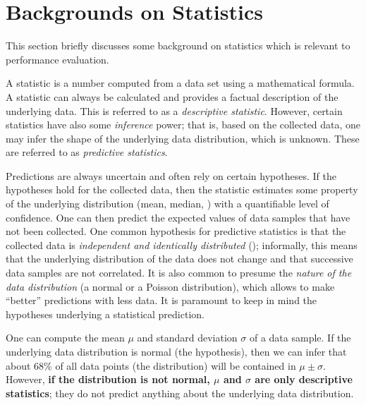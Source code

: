 
\section{Backgrounds on Statistics}
\label{sec:stats}

This section briefly discusses some background on statistics which is relevant to performance evaluation.

A statistic is a number computed from a data set using a mathematical formula.
A statistic can always be calculated and provides a factual description of the underlying data.
This is referred to as a \emph{descriptive statistic}.
However, certain statistics have also some \emph{inference} power; that is, based on the collected data, one may infer the shape of the underlying data distribution, which is unknown. These are referred to as \emph{predictive statistics}.

Predictions are always uncertain and often rely on certain hypotheses. If the hypotheses hold for the collected data, then the statistic estimates some property of the underlying distribution (\eg mean, median, \etc) with a quantifiable level of confidence. One can then predict the expected values of data samples that have not been collected.
One common hypothesis for predictive statistics is that the collected data is \emph{independent and identically distributed} (\iid); informally, this means that the underlying distribution of the data does not change and that successive data samples are not correlated.
It is also common to presume the \emph{nature of the data distribution} (\eg a normal or a Poisson distribution), which allows to make ``better'' predictions with less data.
It is paramount to keep in mind the hypotheses underlying a statistical prediction.

\begin{example}
  One can compute the mean $\mu$ and standard deviation $\sigma$ of a data sample.
  {If} the underlying data distribution is normal (the hypothesis), {then} we can infer that about 68\% of all data points (the distribution) will be contained in $\mu \pm \sigma$.
  However, \textbf{if the distribution is not normal, $\mu$ and $\sigma$ are only descriptive statistics};
  \ie they do not predict anything about the underlying data distribution.
\end{example}

